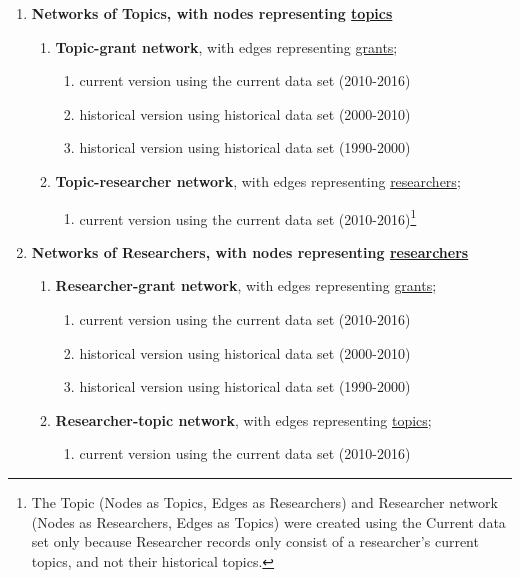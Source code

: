 \begin{enumerate}[noitemsep, label*=\arabic*.]
    \item \textbf{Networks of Topics, with nodes representing \underline{topics}}
    \begin{enumerate}[label*=\arabic*.]
        \item \textbf{Topic-grant network}, with edges representing \underline{grants};
            \begin{enumerate}[label*=\arabic*.]
                \item current version using the current data set (2010-2016)
                \item historical version using historical data set (2000-2010)
                \item historical version using historical data set (1990-2000)
            \end{enumerate}
        \item \textbf{Topic-researcher network}, with edges representing \underline{researchers};
            \begin{enumerate}[label*=\arabic*.]
                \item current version using the current data set (2010-2016)\footnote{The Topic (Nodes as Topics, Edges as Researchers) and Researcher network (Nodes as Researchers, Edges as Topics) were created using the Current data set only because Researcher records only consist of a researcher's current topics, and not their historical topics.}
            \end{enumerate}
    \end{enumerate}

    \item \textbf{Networks of Researchers, with nodes representing \underline{researchers}}
    \begin{enumerate}[label*=\arabic*.]
        \item \textbf{Researcher-grant network}, with edges representing \underline{grants};
        \begin{enumerate}[label*=\arabic*.]
                \item current version using the current data set (2010-2016)
                \item historical version using historical data set (2000-2010)
                \item historical version using historical data set (1990-2000)
            \end{enumerate}
        \item \textbf{Researcher-topic network}, with edges representing \underline{topics};
        \begin{enumerate}[label*=\arabic*.]
                \item current version using the current data set (2010-2016)\footnotemark[1]
        \end{enumerate}
    \end{enumerate}
\end{enumerate}

